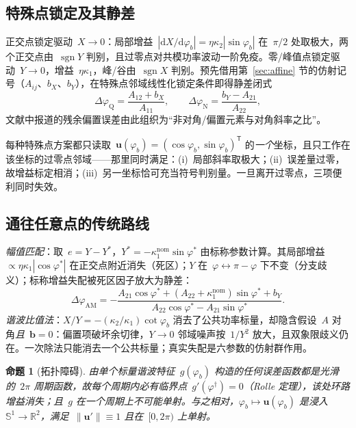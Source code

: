 \documentclass[11pt,journal,onecolumn]{IEEEtran}
\theoremstyle{plain}
\newtheorem{proposition}{命题}
\theoremstyle{remark}
\newcommand{\uv}{\mathbf{u}}
\newcommand{\bv}{\mathbf{b}}
\newcommand{\T}{\mathsf{T}}
\begin{document}
\subsection{特殊点锁定及其静差}
\label{sec:conventional}
正交点锁定驱动~$X\to 0$：局部增益~$|\mathrm{d}X/\mathrm{d}\varphi_b|=\eta\kappa_2|\sin\varphi_b|$ 在~$\pi/2$ 处取极大，两个正交点由~$\operatorname{sgn}Y$ 判别，且过零点对共模功率波动一阶免疫。零/峰值点锁定驱动~$Y\to0$，增益~$\eta\kappa_1$，峰/谷由~$\operatorname{sgn}X$ 判别。预先借用第~\ref{sec:affine} 节的仿射记号（$A_{ij}$、$b_X$、$b_Y$），在特殊点邻域线性化锁定条件即得静差闭式
\begin{equation}
\Delta\varphi_{\mathrm Q}=\frac{A_{12}+b_X}{A_{11}},\qquad
\Delta\varphi_{\mathrm N}=\frac{b_Y-A_{21}}{A_{22}},
\label{eq:staticQ}
\end{equation}
文献中报道的残余偏置误差由此组织为“非对角/偏置元素与对角斜率之比”。

每种特殊点方案都只读取~$\uv(\varphi_b)=(\cos\varphi_b,\sin\varphi_b)^{\T}$ 的\emph{一个}坐标，且只工作在该坐标的过零点邻域——那里同时满足：(i)~局部斜率取极大；(ii)~误差量过零，故增益标定相消；(iii)~另一坐标恰可充当符号判别量。一旦离开过零点，三项便利同时失效。

\subsection{通往任意点的传统路线}
\emph{幅值匹配}：取~$e=Y-Y^\ast$，$Y^\ast=-\kappa_1^{\mathrm{nom}}\sin\varphi^\ast$ 由标称参数计算。其局部增益~$\propto\eta\kappa_1|\cos\varphi^\ast|$ 在正交点附近消失（死区）；$Y$ 在~$\varphi\leftrightarrow\pi-\varphi$ 下不变（分支歧义）；标称增益失配被死区因子放大为静差：
\begin{equation}
\Delta\varphi_{\mathrm{AM}}
=-\frac{A_{21}\cos\varphi^\ast+(A_{22}{+}\kappa_1^{\mathrm{nom}})
\sin\varphi^\ast+b_Y}{A_{22}\cos\varphi^\ast-A_{21}\sin\varphi^\ast}.
\label{eq:staticAM}
\end{equation}
\emph{谐波比值法}：$X/Y=-(\kappa_2/\kappa_1)\cot\varphi_b$ 消去了公共功率标量，却隐含假设~$A$ 对角\emph{且}~$\bv=0$：偏置项破坏余切律，$Y\!\to\!0$ 邻域噪声按~$1/Y^2$ 放大，且双象限歧义仍在。一次除法只能消去一个公共标量；真实失配是六参数的仿射群作用。

\begin{proposition}[拓扑障碍]
\label{prop:rolle}
由单个标量谐波特征~$g(\varphi_b)$ 构造的任何误差函数都是光滑的~$2\pi$ 周期函数，故每个周期内必有临界点~$g'(\varphi^\dagger)=0$（Rolle 定理），该处环路增益消失；且~$g$ 在一个周期上不可能单射。与之相对，$\varphi_b\mapsto\uv(\varphi_b)$ 是浸入~$\mathbb{S}^1\!\to\!\mathbb{R}^2$，满足~$\|\uv'\|\equiv 1$ 且在~$[0,2\pi)$ 上单射。
\end{proposition}
\end{document}
